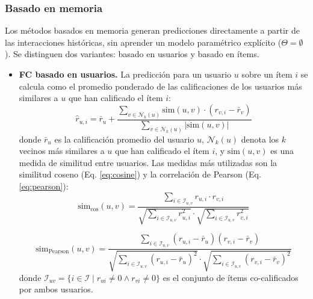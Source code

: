\subsubsection{Basado en memoria} \label{subsubsec:cf_memory}

Los métodos basados en memoria generan predicciones directamente a partir de las interacciones históricas, sin aprender un modelo paramétrico explícito ($\Theta = \emptyset$). Se distinguen dos variantes: basado en usuarios y basado en ítems.

\begin{itemize}
	\item \textbf{FC basado en usuarios.}
	      La predicción para un usuario $u$ sobre un ítem $i$ se calcula como el promedio ponderado de las calificaciones de los usuarios más similares a $u$ que han calificado el ítem $i$:
	      \begin{equation} \label{eq:user_cf}
		      \hat{r}_{u,i} = \bar{r}_u + \frac{\displaystyle\sum_{v \in \mathcal{N}_k(u)} \mathrm{sim}(u, v) \cdot (r_{v,i} - \bar{r}_v)}{\displaystyle\sum_{v \in \mathcal{N}_k(u)} |\mathrm{sim}(u, v)|}
	      \end{equation}
	      donde $\bar{r}_u$ es la calificación promedio del usuario $u$, $\mathcal{N}_k(u)$ denota los $k$ vecinos más similares a $u$ que han calificado el ítem $i$, y $\mathrm{sim}(u, v)$ es una medida de similitud entre usuarios. Las medidas más utilizadas son la similitud coseno (Eq. \ref{eq:cosine}) y la correlación de Pearson (Eq. \ref{eq:pearson}):
	      \begin{equation} \label{eq:cosine}
		      \mathrm{sim}_{\cos}(u, v) = \frac{\displaystyle\sum_{i \in \mathcal{I}_{u,v}} r_{u,i} \cdot r_{v,i}}{\sqrt{\displaystyle\sum_{i \in \mathcal{I}_{u,v}} r_{u,i}^2} \cdot \sqrt{\displaystyle\sum_{i \in \mathcal{I}_{u,v}} r_{v,i}^2}}
	      \end{equation}

	      \begin{equation} \label{eq:pearson}
		      \mathrm{sim}_{\mathrm{Pearson}}(u, v) = \frac{\displaystyle\sum_{i \in \mathcal{I}_{u,v}} (r_{u,i} - \bar{r}_u)(r_{v,i} - \bar{r}_v)}{\sqrt{\displaystyle\sum_{i \in \mathcal{I}_{u,v}} (r_{u,i} - \bar{r}_u)^2} \cdot \sqrt{\displaystyle\sum_{i \in \mathcal{I}_{u,v}} (r_{v,i} - \bar{r}_v)^2}}
	      \end{equation}
	      donde $\mathcal{I}_{uv} = \{i \in \mathcal{I} \mid r_{ui} \neq 0 \land r_{vi} \neq 0\}$ es el conjunto de ítems co-calificados por ambos usuarios.


\end{itemize}
